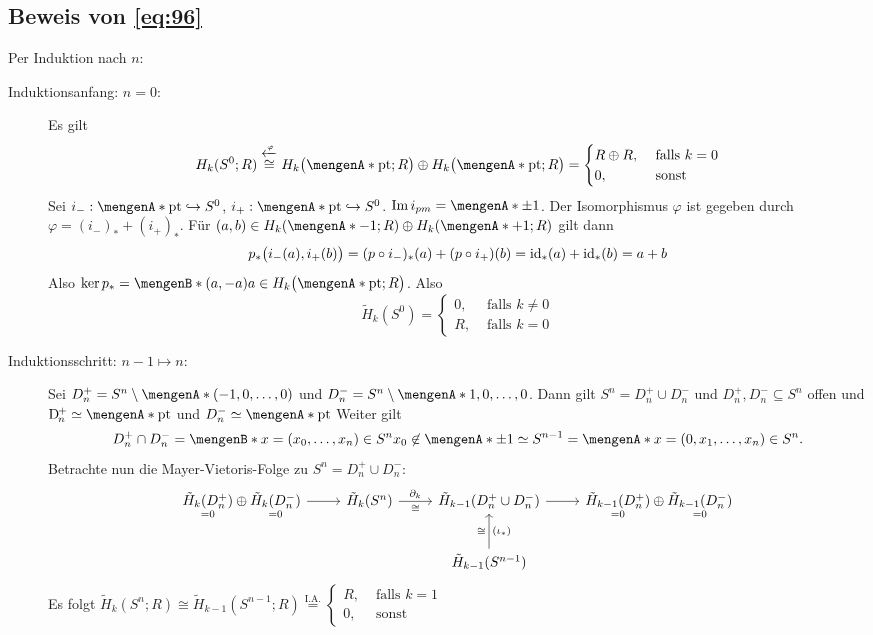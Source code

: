 \subsection[Beweis von \textbf{[\#\#]}]{Beweis von \eqref{eq:96}} %
\label{sub:97}
Per Induktion nach $n$:
\begin{description}
	\item[Induktionsanfang: $n=0$:] Es gilt
	\begin{align*}
		H_k(S^0;R) \stackrel{\xleftarrow{\varphi}}{\cong} H_k \enbrace[\big]{\set{\mathrm{pt}};R } \oplus H_k \enbrace[\big]{\set{\mathrm{pt}};R } = \begin{cases}
			R \oplus R, &\text{ falls }k=0\\
			0 ,&\text{ sonst}
		\end{cases}
	\end{align*} 
	Sei $i_- : \set{\mathrm{pt}} \hookrightarrow S^0$, $i_+ : \set{\mathrm{pt}} \hookrightarrow S^0$. $\im i_{pm} = \set{\pm 1}$.
	Der Isomorphismus $\varphi$ ist gegeben durch $\varphi = (i_-)_* + (i_+)_*$. Für
	$(a,b) \in H_k \enbrace*{\set{-1};R}\oplus H_k \enbrace*{\set{+1};R}$ gilt dann
	\[
		p_* \enbrace[\big]{i_-(a), i_+(b)} = (p \circ i_-)_*(a) + (p \circ i_+)(b) = \id_*(a) + \id_*(b)= a+b
	\]
	Also $\ker p_* = \set[(a,-a)]{a \in H_k \enbrace[\big]{\set{\mathrm{pt}};R}}$. Also 
	\[
		\tilde{H}_k(S^0) = \begin{cases}
			0, &\text{ falls }k \not= 0\\
			R ,&\text{ falls }k=0
		\end{cases}
	\]
	\item[Induktionsschritt: $n-1  \mapsto n$:] Sei $D_n^+ = S^n \setminus \set{(-1,0,\ldots ,0)}$ und $D_n^- = S^n \setminus \set{1,0,\ldots ,0}$. Dann gilt
	$S^n = D_n^+ \cup D_n^-$ und $D_n^+, D_n^- \subseteq S^n$ offen und $\D_n^+ \simeq \set{\mathrm{pt}}$ und $D_n^- \simeq \set{\mathrm{pt}}$
	Weiter gilt 
	\[
		D_n^+ \cap D_n^- = \set[x=(x_0, \ldots , x_n) \in S^n]{x_0 \not\in \set{\pm 1}} \simeq S^{n-1} = \set{x=(0, x_1, \ldots , x_n) \in S^n}.
	\]
	Betrachte nun die Mayer-Vietoris-Folge zu $S^n = D_n^+ \cup D_n^-$: 
	\[
		\begin{tikzcd}
			\underset{=0}{\tilde{H}_k(D_n^+)} \oplus \underset{=0}{\tilde{H}_k(D_n^-)} \rar & 
			\tilde{H}_k(S^n) \rar["\partial_k", "\cong"'] &
			\tilde{H}_{k-1} \enbrace*{D_n^+ \cup D_n^-} \rar & 
			\underset{=0}{\tilde{H}_{k-1}(D_n^+)} \oplus \underset{=0}{\tilde{H}_{k-1}(D_n^-)} \\
			 & & \tilde{H}_{k-1}(S^{n-1}) \uar["\cong", "(\iota_*)"']& 
		\end{tikzcd}
	\]
	Es folgt $\tilde{H}_k(S^n;R) \cong \tilde{H}_{k-1}(S^{n-1};R) \stackrel{\text{I.A.}}{=} \begin{cases}
		R, &\text{ falls }k=1\\
		0, &\text{ sonst}
	\end{cases}$ \bewende
\end{description}
\newpage

